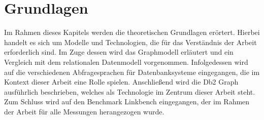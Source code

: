\chapter{Grundlagen}
Im Rahmen dieses Kapitels werden die theoretischen Grundlagen erörtert. Hierbei handelt es sich um Modelle und Technologien, die für das Verständnis der Arbeit erforderlich sind. Im Zuge dessen wird das Graphmodell erläutert und ein Vergleich mit dem relationalen Datenmodell vorgenommen. Infolgedessen wird auf die verschiedenen Abfragesprachen für Datenbanksysteme eingegangen, die im Kontext dieser Arbeit eine Rolle spielen. Anschließend wird die Db2 Graph ausführlich beschrieben, welches als Technologie im Zentrum dieser Arbeit steht. Zum Schluss wird auf den Benchmark Linkbench eingegangen, der im Rahmen der Arbeit für alle Messungen herangezogen wurde.




